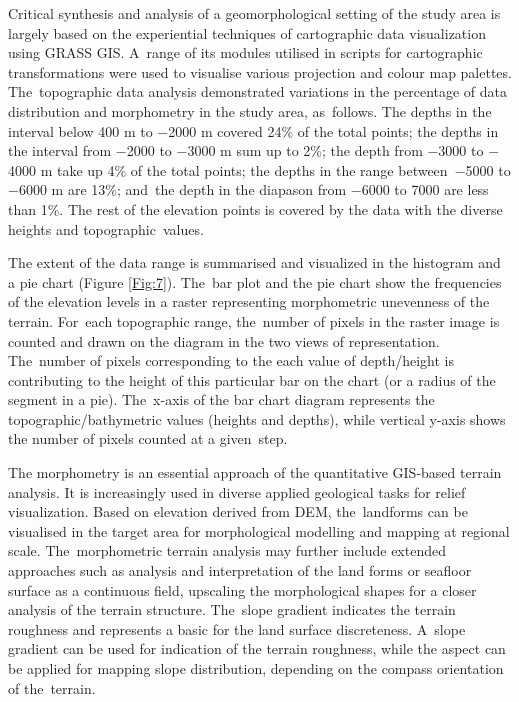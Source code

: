 \documentclass[technologies,article,accept,pdftex,moreauthors]{Definitions/mdpi}
\begin{document}
Critical synthesis and analysis of a geomorphological setting of the study area is largely based on the experiential techniques of cartographic data visualization using GRASS GIS. A~range of its modules utilised in scripts for cartographic transformations were used to visualise various projection and colour map palettes. The~topographic data analysis demonstrated variations in {the percentage of }data distribution and morphometry in the study area, as~follows.{ }The depths in the interval below 400 m to $-$2000 m covered 24\% of the total points; the depths in the interval from $-$2000 to $-$3000 m sum up to 2\%; the depth  from $-$3000 to $-$4000 m take up 4\% of the total points; the depths in the range \mbox{between $-$5000} to $-$6000 m are 13\%; and~the depth in the diapason from $-$6000 to 7000 are less than 1\%. {The} rest of the elevation points is covered by the data with {the} diverse heights and topographic~values.
  
The extent of the data range is summarised and visualized in the histogram and a pie chart {(Figure }\ref{Fig:7}). The~bar plot and the pie chart show the frequencies of the elevation levels in a raster representing morphometric unevenness of the terrain. For~each topographic range, the~number of pixels in the raster image is counted and drawn on the diagram in the two views of representation. The~number of pixels corresponding to the each value of depth/height is contributing to the height of this particular bar on the chart (or a radius of the segment in a pie). The~x-axis of the bar chart diagram represents the topographic/bathymetric values (heights and depths), while vertical y-axis shows the number of pixels counted at a given~step.

The morphometry is an essential approach of the quantitative GIS-based terrain analysis. It is increasingly used in diverse applied geological tasks for relief visualization. Based on elevation {derived from} DEM, the~landforms can be visualised in the target area for morphological modelling and mapping at regional scale. The~morphometric terrain analysis may further include extended approaches such as analysis and interpretation of the land forms or seafloor surface as a continuous field, upscaling the morphological shapes for a closer analysis of the terrain structure. The~slope gradient indicates the terrain roughness and represents a basic for the land surface discreteness. A~slope gradient can be used for indication of the terrain roughness, while the aspect can be applied for mapping slope distribution, depending on the compass orientation of the~terrain. 
\end{document}
